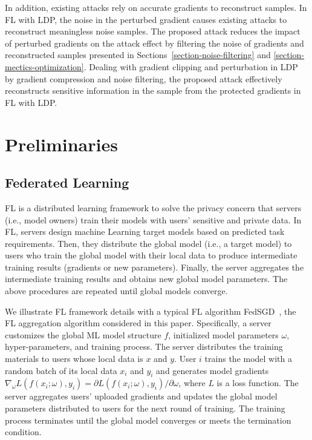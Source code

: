 \documentclass[lettersize,journal]{IEEEtran}
\begin{document}
In addition, existing attacks rely on accurate gradients to reconstruct samples. In FL with LDP, the noise in the perturbed gradient causes existing attacks to reconstruct meaningless noise samples. The proposed attack reduces the impact of perturbed gradients on the attack effect by filtering the noise of gradients and reconstructed samples presented in Sections~\ref{section-noise-filtering} and \ref{section-mectics-optimization}. Dealing with gradient clipping and perturbation in LDP by gradient compression and noise filtering, the proposed attack effectively reconstructs sensitive information in the sample from the protected gradients in FL with LDP.

\section{Preliminaries}

\subsection{Federated Learning}

FL is a distributed learning framework to solve the privacy concern that servers (i.e., model owners) train their models with users' sensitive and private data. In FL, servers design machine Learning target models based on predicted task requirements. Then, they distribute the global model (i.e., a target model) to users who train the global model with their local data to produce intermediate training results (gradients or new parameters). Finally, the server aggregates the intermediate training results and obtains new global model parameters. The above procedures are repeated until global models converge.

We illustrate FL framework details with a typical FL algorithm FedSGD~\cite{McMahan2017FedSGD}, the FL aggregation algorithm considered in this paper. Specifically, a server customizes the global ML model structure $f$, initialized model parameters $\omega$, hyper-parameters, and training process. The server distributes the training materials to users whose local data is $x$ and $y$. User $i$ trains the model with a random batch of its local data $x_i$ and $y_i$ and generates model gradients $\nabla_\omega L(f(x_i;\omega), y_i) = \partial L(f(x_i;\omega), y_i) / \partial \omega$, where $L$ is a loss function. The server aggregates users' uploaded gradients and updates the global model parameters distributed to users for the next round of training. The training process terminates until the global model converges or meets the termination condition.
\end{document}

